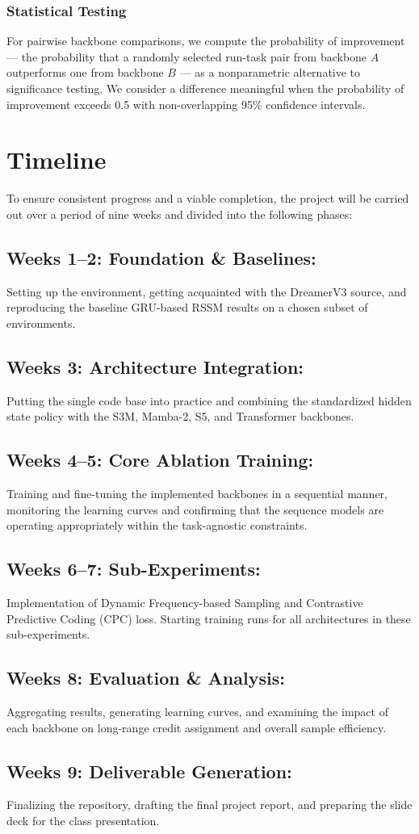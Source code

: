 \documentclass{article}
\begin{document}
\subsubsection{Statistical Testing}
For pairwise backbone comparisons, we compute the probability of
improvement\cite{rliable} --- the probability that a randomly
selected run-task pair from backbone $A$ outperforms one from
backbone $B$ --- as a nonparametric alternative to significance
testing. We consider a difference meaningful when the probability of
improvement exceeds 0.5 with non-overlapping 95\% confidence
intervals.

\section{Timeline}
To ensure consistent progress and a viable completion, the project will be carried out over a period of nine weeks and divided into the following phases:

\subsection{Weeks 1--2: Foundation \& Baselines:} Setting up the environment, getting acquainted with the DreamerV3 source, and reproducing the baseline GRU-based RSSM results on a chosen subset of environments.
\subsection{Weeks 3: Architecture Integration:} Putting the single code base into practice and combining the standardized hidden state policy with the S3M, Mamba-2, S5, and Transformer backbones.
\subsection{Weeks 4--5: Core Ablation Training:} Training and fine-tuning the implemented backbones in a sequential manner, monitoring the learning curves and confirming that the sequence models are operating appropriately within the task-agnostic constraints.
\subsection{Weeks 6--7: Sub-Experiments:} Implementation of Dynamic Frequency-based Sampling and Contrastive Predictive Coding (CPC) loss. Starting training runs for all architectures in these sub-experiments.
\subsection{Weeks 8: Evaluation \& Analysis:} Aggregating results, generating learning curves, and examining the impact of each backbone on long-range credit assignment and overall sample efficiency.
\subsection{Weeks 9: Deliverable Generation:} Finalizing the repository, drafting the final project report, and preparing the slide deck for the class presentation.


% 
% 
\printbibliography
\end{document}
